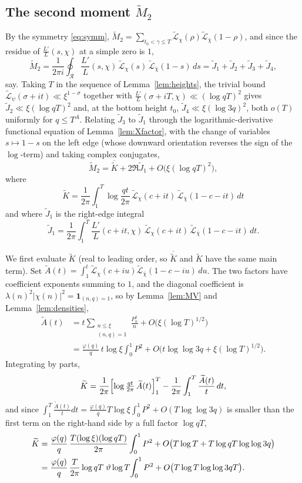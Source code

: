 \documentclass[10pt,a4paper]{amsart}
\numberwithin{equation}{section}
\begin{document}
\subsection{The second moment $\widetilde M_2$}
By the symmetry \eqref{eq:symm}, $\widetilde M_2=\sum_{t_0<\gamma\le T}\widetilde{\mathcal L}_\chi(\rho)\widetilde{\mathcal L}_{\bar\chi}(1-\rho)$, and since the residue of $\frac{L'}{L}(s,\chi)$ at a simple zero is $1$,
\[
\widetilde M_2=\frac{1}{2\pi i}\oint_{\mathcal R}\frac{L'}{L}(s,\chi)\,\widetilde{\mathcal L}_\chi(s)\,\widetilde{\mathcal L}_{\bar\chi}(1-s)\,ds=\widetilde J_1+\widetilde J_2+\widetilde J_3+\widetilde J_4,
\]
say. Taking $T$ in the sequence of Lemma~\ref{lem:heights}, the trivial bound $\widetilde{\mathcal L}_\psi(\sigma+it)\ll\xi^{1-\sigma}$ together with $\frac{L'}{L}(\sigma+iT,\chi)\ll(\log qT)^2$ gives $\widetilde J_2\ll\xi(\log qT)^2$ and, at the bottom height $t_0$, $\widetilde J_4\ll\xi(\log 3q)^2$, both $o(T)$ uniformly for $q\le T^{A}$. Relating $\widetilde J_3$ to $\widetilde J_1$ through the logarithmic-derivative functional equation of Lemma~\ref{lem:Xfactor}, with the change of variables $s\mapsto1-s$ on the left edge (whose downward orientation reverses the sign of the $\log$-term) and taking complex conjugates,
\[
\widetilde M_2=\overline{\widetilde K}+2\Re\widetilde J_1+O\bigl(\xi(\log qT)^2\bigr),
\]
where
\[
\widetilde K=\frac{1}{2\pi}\int_1^T\log\frac{qt}{2\pi}\,\widetilde{\mathcal L}_\chi(c+it)\,\widetilde{\mathcal L}_{\bar\chi}(1-c-it)\,dt
\]
and where $\widetilde J_1$ is the right-edge integral
\[
\widetilde J_1=\frac{1}{2\pi}\int_1^T\frac{L'}{L}(c+it,\chi)\,\widetilde{\mathcal L}_\chi(c+it)\,\widetilde{\mathcal L}_{\bar\chi}(1-c-it)\,dt .
\]

We first evaluate $\widetilde K$ (real to leading order, so $\overline{\widetilde K}$ and $\widetilde K$ have the same main term). Set $\widetilde A(t)=\int_1^t\widetilde{\mathcal L}_\chi(c+iu)\widetilde{\mathcal L}_{\bar\chi}(1-c-iu)\,du$. The two factors have coefficient exponents summing to $1$, and the diagonal coefficient is $\lambda(n)^2|\chi(n)|^2=\mathbf 1_{(n,q)=1}$, so by Lemma~\ref{lem:MV} and Lemma~\ref{lem:densities},
\[
\begin{aligned}
\widetilde A(t)&=t\sum_{\substack{n\le\xi\\(n,q)=1}}\frac{P_n^2}{n}+O\bigl(\xi(\log T)^{1/2}\bigr)\\
&=\frac{\varphi(q)}{q}\,t\log\xi\int_0^1 P^2+O\bigl(t\log\log 3q+\xi(\log T)^{1/2}\bigr).
\end{aligned}
\]
Integrating by parts,
\[
\widetilde K=\frac{1}{2\pi}\Bigl[\log\tfrac{qt}{2\pi}\,\widetilde A(t)\Bigr]_1^T-\frac{1}{2\pi}\int_1^T\frac{\widetilde A(t)}{t}\,dt,
\]
and since $\int_1^T\frac{\widetilde A(t)}{t}dt=\tfrac{\varphi(q)}{q}T\log\xi\int_0^1 P^2+O(T\log\log 3q)$ is smaller than the first term on the right-hand side by a full factor $\log qT$,
\begin{align}
\widetilde K&=\frac{\varphi(q)}{q}\,\frac{T(\log\xi)(\log qT)}{2\pi}\int_0^1 P^2+O\bigl(T\log T+T\log qT\log\log 3q\bigr)\notag\\
&=\frac{\varphi(q)}{q}\,\frac{T}{2\pi}\log qT\;\vartheta\log T\!\int_0^1 P^2+O\bigl(T\log T\log\log 3qT\bigr).\label{eq:K-Ng}
\end{align}
\end{document}
